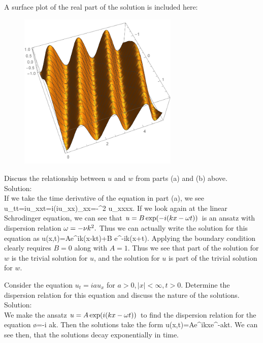 A surface plot of the real part of the solution is included here:
\begin{figure}[h]
\centering
\includegraphics[width=3in]{surf_deriv_lin_schrodinger}
\end{figure}

\item Discuss the relationship between $u$ and $w$ from parts (a) and (b) above.\\

Solution:\\

If we take the time derivative of the equation in part (a), we see
\bq u_{tt}=i\nu u_{xxt}=i\nu(i\nu u_{xx})_{xx}=-\nu^2 u_{xxxx}.\eq
If we look again at the linear Schrodinger equation, we can see that $u=B\exp(-i(kx-\omega t))$ is an ansatz with dispersion relation $\omega=-\nu k^2.$ Thus we can actually write the solution for this equation as
\bq u(x,t)=Ae^{ik(x-\nu kt)}+B e^{-ik(x+\nu t)}.\eq
Applying the boundary condition clearly requires $B=0$ along with $A=1.$ Thus we see that part of the solution for $w$ is the trivial solution for $u$, and the solution for $u$ is part of the trivial solution for $w$. 


\eenum
\item Consider the equation $u_t=iau_x$ for $a>0,|x|<\infty,t>0.$ Determine the dispersion relation for this equation and discuss the nature of the solutions.\\

Solution:\\

We make the ansatz $u=A \exp(i(kx-\omega t))$ to find the dispersion relation for the equation
\bq \o=-i ak.\eq
Then the solutions take the form
\bq u(x,t)=Ae^{ikx}e^{-akt}.\eq
We can see then, that the solutions decay exponentially in time.


